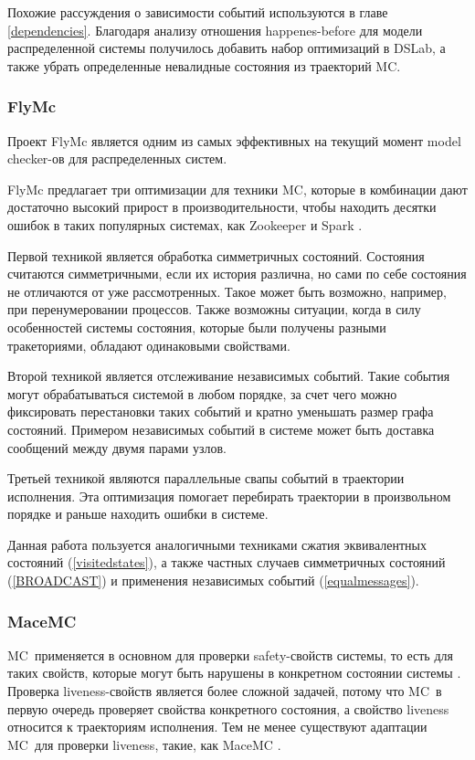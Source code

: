 \documentclass[a4paper,12pt]{extarticle}
\newcommand{\mc}[0]{MC}
\begin{document}
Похожие рассуждения о зависимости событий используются в главе \ref{dependencies}.
Благодаря анализу отношения happenes-before для модели распределенной системы получилось добавить набор оптимизаций в DSLab, а также убрать определенные невалидные состояния из траекторий \mc. 


\subsubsection{FlyMc}

Проект FlyMc \cite{b6} является одним из самых эффективных на текущий момент model checker-ов для распределенных систем.

FlyMc предлагает три оптимизации для техники \mc, которые в комбинации дают достаточно высокий прирост в производительности, чтобы находить десятки ошибок в таких популярных системах, как Zookeeper \cite{b7} и Spark \cite{b8}.

Первой техникой является обработка симметричных состояний.
Состояния считаются симметричными, если их история различна, но сами по себе состояния не отличаются от уже рассмотренных.
Такое может быть возможно, например, при перенумеровании процессов.
Также возможны ситуации, когда в силу особенностей системы состояния, которые были получены разными тракеториями, обладают одинаковыми свойствами.

Второй техникой является отслеживание независимых событий.
Такие события могут обрабатываться системой в любом порядке, за счет чего можно фиксировать перестановки таких событий и кратно уменьшать размер графа состояний.
Примером независимых событий в системе может быть доставка сообщений между двумя парами узлов. 

Третьей техникой являются параллельные свапы событий в траектории исполнения.
Эта оптимизация помогает перебирать траектории в произвольном порядке и раньше находить ошибки в системе.

Данная работа пользуется аналогичными техниками сжатия эквивалентных состояний (\cref{visitedstates}), а также частных случаев симметричных состояний (\cref{BROADCAST}) и применения независимых событий (\cref{equalmessages}).



\subsubsection{MaceMC}

\mc\ применяется в основном для проверки safety-свойств системы, то есть для таких свойств, которые могут быть нарушены в конкретном состоянии системы \cite{b30}.
Проверка liveness-свойств является более сложной задачей, потому что \mc\ в первую очередь проверяет свойства конкретного состояния, а свойство liveness относится к траекториям исполнения.
Тем не менее существуют адаптации \mc\ для проверки liveness, такие, как MaceMC \cite{b19}.
\end{document}
